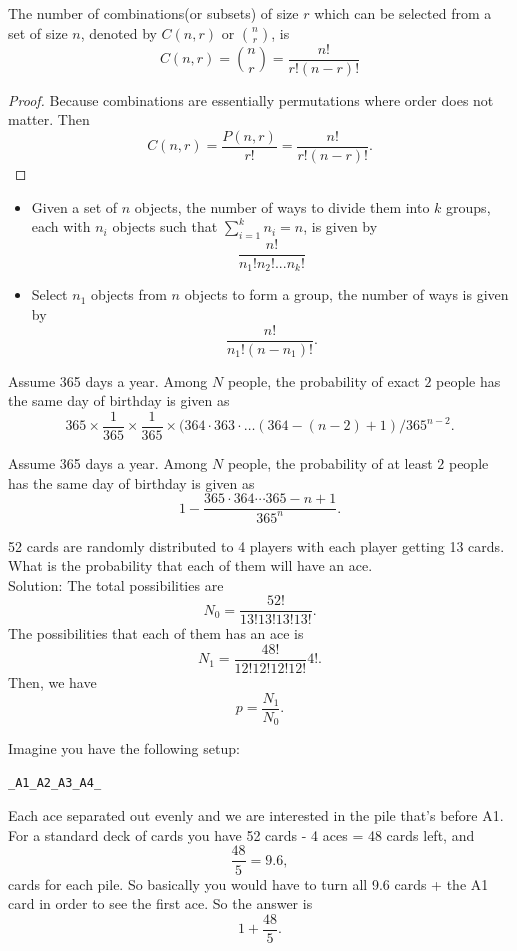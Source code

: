 \begin{refsection}
\begin{theorem}
The number of combinations(or subsets) of size $r$ which can be selected from a set of size $n$, denoted by $C(n,r)$ or $\binom{n}{r}$, is 
$$C(n,r) = \binom{n}{r} = \frac{n!}{r!(n-r)!}$$
\end{theorem}
\begin{proof}
Because combinations are essentially permutations where order does not matter. Then 
$$C(n,r) = \frac{P(n,r)}{r!} = \frac{n!}{r!(n-r)!}.$$
\end{proof}




\begin{lemma}\hfill
	\begin{itemize}
		\item Given a set of $n$ objects, the number of ways to divide them into $k$ groups, each with $n_i$ objects such that $\sum_{i=1}^k n_i = n$, is given by
		$$\frac{n!}{n_1!n_2!...n_k!}$$
		\item Select $n_1$ objects from $n$ objects to form a group, the number of ways is given by
		$$\frac{n!}{n_1!(n-n_1)!}.$$ 
	\end{itemize}
\end{lemma}


\begin{example}
	Assume 365 days a year. Among $N$ people, the probability of exact $2$ people has the same day of birthday is given as
	$$365\times \frac{1}{365}\times \frac{1}{365}\times ( 364 \cdot 363\cdot \dots (364-(n-2)+1)/365^{n-2}.$$
\end{example}

\begin{example}
	Assume 365 days a year. Among $N$ people, the probability of at least $2$ people has the same day of birthday is given as
	$$1 - \frac{365\cdot 364 \cdots 365-n+1}{365^n}.$$
\end{example}


\begin{example}
52 cards are randomly distributed to 4 players with each player getting 13 cards. What is the probability that each of them will have an ace. \\
Solution:
The total possibilities are
$$N_0 = \frac{52!}{13!13!13!13!}.$$
The possibilities that each of them has an ace is
$$N_1=\frac{48!}{12!12!12!12!}4!.$$
Then, we have
$$p = \frac{N_1}{N_0}.$$
\end{example}


\begin{example}
Imagine you have the following setup: 
\begin{verbatim}
_A1_A2_A3_A4_
\end{verbatim}
Each ace separated out evenly and we are interested in the pile that's before A1. For a standard deck of cards you have 52 cards - 4 aces = 48 cards left, and
$$\frac{48}{5} = 9.6,$$
cards for each pile. So basically you would have to turn all 9.6 cards + the A1 card in order to see the first ace. So the answer is
$$1 + \frac{48}{5}.$$
\end{example}



\end{refsection}
